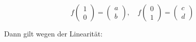\[
f \begin{pmatrix} 1 \\ 0 \end{pmatrix} = \begin{pmatrix} a \\ b \end{pmatrix}, 
\quad f \begin{pmatrix} 0 \\ 1 \end{pmatrix} = \begin{pmatrix} c \\ d \end{pmatrix}
\]



Dann gilt wegen der Linearität:




